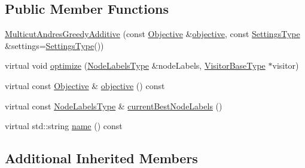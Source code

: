 \subsection*{Public Member Functions}
\begin{DoxyCompactItemize}
\item 
\hyperlink{classnifty_1_1graph_1_1optimization_1_1multicut_1_1MulticutAndresGreedyAdditive_ab1596c53c67462eaafed9e44aa455a1f}{Multicut\+Andres\+Greedy\+Additive} (const \hyperlink{classnifty_1_1graph_1_1optimization_1_1multicut_1_1MulticutAndres_ac2d2044ef4dc45dbacdb3f34b001760f}{Objective} \&\hyperlink{classnifty_1_1graph_1_1optimization_1_1multicut_1_1MulticutAndresGreedyAdditive_a0ee62e21648900255e50b34155bf9443}{objective}, const \hyperlink{structnifty_1_1graph_1_1optimization_1_1multicut_1_1MulticutAndresGreedyAdditive_1_1SettingsType}{Settings\+Type} \&settings=\hyperlink{structnifty_1_1graph_1_1optimization_1_1multicut_1_1MulticutAndresGreedyAdditive_1_1SettingsType}{Settings\+Type}())
\item 
virtual void \hyperlink{classnifty_1_1graph_1_1optimization_1_1multicut_1_1MulticutAndresGreedyAdditive_ac7fe8288460dba66d9f570edb47dc82d}{optimize} (\hyperlink{classnifty_1_1graph_1_1optimization_1_1multicut_1_1MulticutAndres_aebe9bae6ca2760f72e19ec62504de209}{Node\+Labels\+Type} \&node\+Labels, \hyperlink{classnifty_1_1graph_1_1optimization_1_1multicut_1_1MulticutAndres_a2d78bb58be29b7d46e9c653489a6d1de}{Visitor\+Base\+Type} $\ast$visitor)
\item 
virtual const \hyperlink{classnifty_1_1graph_1_1optimization_1_1multicut_1_1MulticutAndres_ac2d2044ef4dc45dbacdb3f34b001760f}{Objective} \& \hyperlink{classnifty_1_1graph_1_1optimization_1_1multicut_1_1MulticutAndresGreedyAdditive_a0ee62e21648900255e50b34155bf9443}{objective} () const 
\item 
virtual const \hyperlink{classnifty_1_1graph_1_1optimization_1_1multicut_1_1MulticutAndres_aebe9bae6ca2760f72e19ec62504de209}{Node\+Labels\+Type} \& \hyperlink{classnifty_1_1graph_1_1optimization_1_1multicut_1_1MulticutAndresGreedyAdditive_af04a57e6d7ede3bcaaffe8c44fb8d0e5}{current\+Best\+Node\+Labels} ()
\item 
virtual std\+::string \hyperlink{classnifty_1_1graph_1_1optimization_1_1multicut_1_1MulticutAndresGreedyAdditive_aa65b043b96d8a11cdd7ac5e83a6cc0aa}{name} () const 
\end{DoxyCompactItemize}
\subsection*{Additional Inherited Members}


